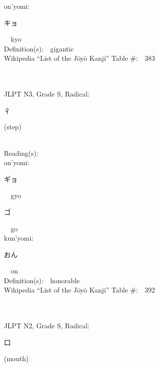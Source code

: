 \begin{multicols}{2}
{\hspace*{1em}}on'yomi:\ \ \\
{\hspace*{2em}}{\begin{CJK}{UTF8}{min} キョ \end{CJK}}\ \ kyo\ \ \\
Definition(s):\ \ gigantic \\
Wikipedia ``List of the J\=oy\=o Kanji'' Table \#:\ \ 383 \\
\ \ \\
{\fontsize{34pt}{40pt}  }\ \ \\  %
{JLPT N3, Grade S, Radical:\ \ {\begin{CJK}{UTF8}{min} 彳 \end{CJK}} (step) } \\
Reading(s):\ \ \\
{\hspace*{1em}}on'yomi:\ \ \\
{\hspace*{2em}}{\begin{CJK}{UTF8}{min} ギョ \end{CJK}}\ \ gyo\ \ \\
{\hspace*{2em}}{\begin{CJK}{UTF8}{min} ゴ \end{CJK}}\ \ go\ \ \\
{\hspace*{1em}}kun'yomi:\ \ \\
{\hspace*{2em}}{\begin{CJK}{UTF8}{min} おん \end{CJK}}\ \ on\ \ \\
Definition(s):\ \ honorable \\
Wikipedia ``List of the J\=oy\=o Kanji'' Table \#:\ \ 392 \\
\ \ \\
{\fontsize{34pt}{40pt}  }\ \ \\  %
{JLPT N2, Grade S, Radical:\ \ {\begin{CJK}{UTF8}{min} 口 \end{CJK}} (mouth) } \\

\end{multicols}
